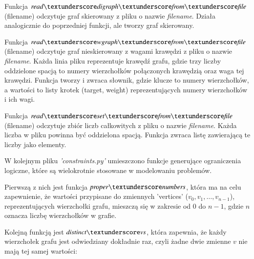 
\vspace{0.5cm}

Funkcja $\readdigraph$(filename) odczytuje graf skierowany z pliku o nazwie \textit{filename}. Działa analogicznie do poprzedniej funkcji, ale tworzy graf skierowany.


\vspace{0.5cm}

Funkcja $\readwgraph$(filename) odczytuje graf nieskierowany z wagami krawędzi z pliku o nazwie \textit{filename}. Każda linia pliku reprezentuje krawędź grafu, gdzie trzy liczby oddzielone spacją to numery wierzchołków połączonych krawędzią oraz waga tej krawędzi. Funkcja tworzy i zwraca słownik, gdzie klucze to numery wierzchołków, a wartości to listy krotek (target, weight) reprezentujących numery wierzchołków i ich wagi.


\vspace{0.5cm}

Funkcja $\readset$(filename) odczytuje zbiór liczb całkowitych z pliku o nazwie \textit{filename}. Każda liczba w pliku powinna być oddzielona spacją. Funkcja zwraca listę zawierającą te liczby jako elementy.


\vspace{1cm}

W kolejnym pliku \textit{'constraints.py'} umieszczono funkcje generujące ograniczenia logiczne, które są wielokrotnie stosowane w modelowaniu problemów.

Pierwszą z nich jest funkcja $\propernumbers$, która ma na celu zapewnienie, że wartości przypisane do zmiennych 'vertices' ($v_0, v_1, …, v_{n-1}$), reprezentujących wierzchołki grafu, mieszczą się w zakresie od $0$ do $n - 1$, gdzie $n$ oznacza liczbę wierzchołków w grafie. 


\vspace{0.5cm}

Kolejną funkcją jest $\distinctvs$, która zapewnia, że każdy wierzchołek grafu jest odwiedziany dokładnie raz, czyli żadne dwie zmienne \(v\) nie mają tej samej wartości:


\vspace{0.5cm}

